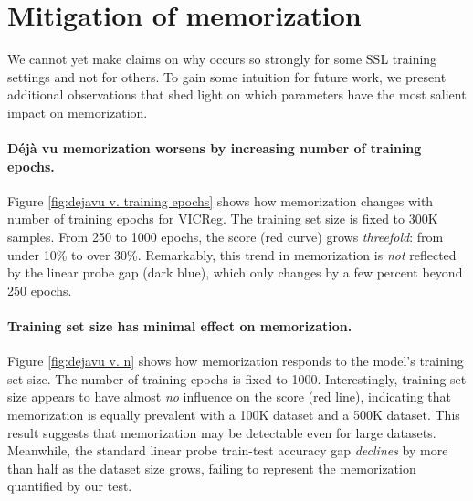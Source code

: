 \vspace{-.5em} 
\section{Mitigation of \dejavu memorization}
\label{sec:mitigation}

We cannot yet make claims on why \dejavu occurs so strongly for some SSL training settings and not for others. To gain some intuition for future work, we present additional observations that shed light on which parameters have the most salient impact on \dejavu memorization.
\vspace{-.75em}
\paragraph{Déjà vu memorization worsens by increasing number of training epochs.} 
Figure \ref{fig:dejavu v. training epochs} shows how \dejavu memorization changes with number of training epochs for VICReg. The training set size is fixed to 300K samples. From 250 to 1000 epochs, the \dejavu score (red curve) grows \emph{threefold}: from under 10\% to over 30\%. Remarkably, this trend in memorization is \emph{not} reflected by the linear probe gap (dark blue), which only changes by a few percent beyond 250 epochs. 

\paragraph{Training set size has minimal effect on \dejavu memorization.} Figure \ref{fig:dejavu v. n} shows how \dejavu memorization responds to the model's training set size. The number of training epochs is fixed to 1000. Interestingly, training set size appears to have almost \emph{no} influence on the \dejavu score (red line), indicating that memorization is equally prevalent with a 100K dataset and a 500K dataset. This result suggests that \dejavu memorization may be detectable even for large datasets. Meanwhile, the standard linear probe train-test accuracy gap \emph{declines} by more than half as the dataset size grows, failing to represent the memorization quantified by our test. 
\vspace{-0.5em}
